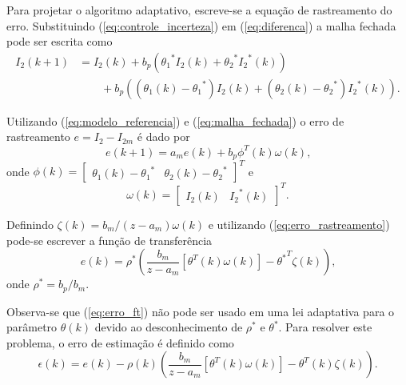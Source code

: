   Para projetar o algoritmo adaptativo, escreve-se a equação de rastreamento do erro. Substituindo (\ref{eq:controle_incerteza}) em (\ref{eq:diferenca}) a malha fechada pode ser escrita como
  \begin{equation}
    \begin{split}
      I_2 (k + 1) &= I_2 (k) + b_p \left( {\theta_1}^* I_2 (k) + {\theta_2}^* {I_2}^*
      (k) \right)\\
      &\qquad {}+ b_p \left( (\theta_1 (k) - {\theta_1}^*) I_2 (k) + ( \theta_2 (k)
      - {\theta_2}^*) {I_2}^* (k) \right) \text{.}
    \end{split}
    \label{eq:malha_fechada}
  \end{equation}

  Utilizando (\ref{eq:modelo_referencia}) e (\ref{eq:malha_fechada}) o erro de rastreamento $e = I_2 - I_{2m}$ é dado por
  \begin{equation}
    e (k+1) = a_m e(k) + b_p \phi^T (k) \omega (k) \text{,}
    \label{eq:erro_rastreamento}
  \end{equation}
  onde $\phi (k) = {\left[ \begin{matrix} \theta_1 (k) - {\theta_1}^* & \theta_2 (k) - {\theta_2}^*
  \end{matrix} \right]}^T$ e
  \begin{equation}
    \omega (k) = {\left[ \begin{matrix} I_2 (k) & {I_2}^* (k) \end{matrix} \right]}^T \text{.}
    \label{eq:omega_k}
  \end{equation}

  Definindo $\zeta (k) = b_m / (z - a_m) \omega (k)$ e utilizando (\ref{eq:erro_rastreamento}) pode-se escrever a função de transferência
  \begin{equation}
    e(k) = \rho^* \left( \frac{b_m}{z - a_m} \left[ \theta^T (k) \omega (k) \right]
      - {\theta^*}^T \zeta (k) \right) \text{,}
    \label{eq:erro_ft}
  \end{equation}
  onde $\rho^* = b_p / b_m$.

  Observa-se que (\ref{eq:erro_ft}) não pode ser usado em uma lei adaptativa para o parâmetro $\theta (k)$ devido ao desconhecimento de $\rho^*$ e $\theta^*$. Para resolver este problema, o erro de estimação é definido como
  \begin{equation}
    \epsilon (k) = e (k) - \rho(k) \left( \frac{b_m}{z - a_m} \left[ \theta^T (k) \omega(k)
      \right] - \theta^T (k) \zeta(k) \right) \text{.}
    \label{eq:erro_estimacao}
  \end{equation}

